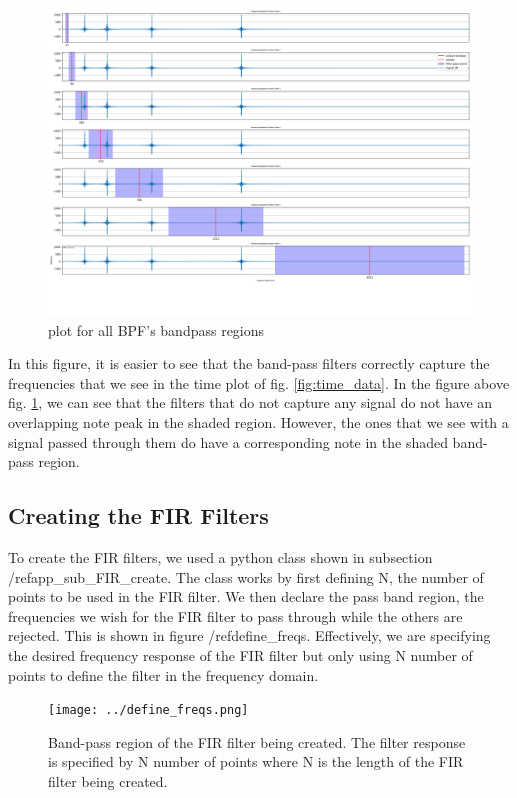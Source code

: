 \documentclass[a4paper, 11pt]{exam}
\begin{document}
\begin{figure}[h!]
  \centering
  \hspace*{-1.5cm}\includegraphics[width=17cm]{../fft_freqdata.png}
  \caption{plot for all BPF's bandpass regions}
  \label{fig:bandpass_regions}
\end{figure}
In this figure, it is easier to see that the band-pass filters correctly capture the frequencies that we see in the time plot of fig. \ref{fig:time_data}. In the figure above fig. \ref{fig:bandpass_regions}, we can see that the filters that do not capture any signal do not have an overlapping note peak in the shaded region. However, the ones that we see with a signal passed through them do have a corresponding note in the shaded band-pass region. 

\subsection{Creating the FIR Filters}
To create the FIR filters, we used a python class shown in subsection /ref{app_sub_FIR_create}. The class works by first defining N, the number of points to be used in the FIR filter. We then declare the pass band region, the frequencies we wish for the FIR filter to pass through while the others are rejected. This is shown in figure /ref{define_freqs}. Effectively, we are specifying the desired frequency response of the FIR filter but only using N number of points to define the filter in the frequency domain.

\newpage
\begin{figure}[h!]
  \centering
  \hspace*{-1.5cm}\texttt{[image: ../define\_freqs.png]}
  \caption{Band-pass region of the FIR filter being created. The filter response is specified by N number of points where N is the length of the FIR filter being created.}
  \label{fig:define_freqs}
\end{figure}
\end{document}
